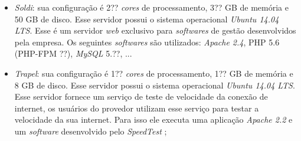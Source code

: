 \begin{itemize}
 \item \textit{Soldi}: sua configuração é 2?? \textit{cores} de processamento, 3?? GB de memória e 50 GB de disco. Esse servidor possui o 
 sistema operacional \textit{Ubuntu 14.04 \ac{LTS}}. Esse é um servidor \textit{web} exclusivo para \textit{softwares} de gestão desenvolvidos
 pela empresa. Os seguintes \textit{softwares} são utilizados: \textit{Apache 2.4}, \ac{PHP} 5.6 (PHP-FPM ??), \textit{MySQL} 5.??, ...
 
 \item \textit{Trapel}: sua configuração é 1?? \textit{cores} de processamento, 1?? GB de memória e 8 GB de disco. Esse servidor possui o 
 sistema operacional \textit{Ubuntu 14.04 \ac{LTS}}. Esse servidor fornece um serviço de teste de velocidade da conexão de internet, os 
 usuários do provedor utilizam esse serviço para testar a velocidade da sua internet. Para isso ele executa uma aplicação \textit{Apache 2.2} 
 e um \textit{software} desenvolvido pelo \textit{SpeedTest} \cite{speedtest};
\end{itemize}

